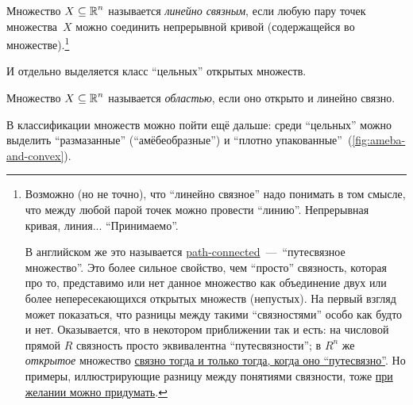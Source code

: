 \documentclass[a4paper,12pt]{article}
\begin{document}
  \begin{definition}
      Множество $X \hm\subseteq \RR^n$ называется \emph{линейно связным}, если любую пару точек множества~$X$ можно соединить непрерывной кривой (содержащейся во множестве).\footnote{
        Возможно (но не точно), что ``линейно связное'' надо понимать в том смысле, что между любой парой точек можно провести ``линию''.
        Непрерывная кривая, линия...
        ``Принимаемо''.
        
        В английском же это называется \href{https://en.wikipedia.org/wiki/Connected_space\#Path_connectedness}{path-connected}~---~``путесвязное множество''.
        Это более сильное свойство, чем ``просто'' связность, которая про то, представимо или нет данное множество как объединение двух или более непересекающихся открытых множеств (непустых).  %
        На первый взгляд может показаться, что разницы между такими ``связностями'' особо как будто и нет.
        Оказывается, что в некотором приближении так и есть: на числовой прямой $R$ связность просто эквивалентна ``путесвязности''; в $R^n$ же \emph{открытое} множество \href{https://en.wikipedia.org/wiki/Connected_space\#Path_connectedness}{связно тогда и только тогда, когда оно ``путесвязно''}.
        Но примеры, иллюстрирующие разницу между понятиями связности, тоже \href{https://w.wiki/DGXV}{при желании можно придумать}.
      }
  \end{definition}

  И отдельно выделяется класс ``цельных'' открытых множеств.

  \begin{definition}
    Множество $X \hm\subseteq \RR^n$ называется \emph{областью}, если оно открыто и линейно связно.
  \end{definition}

  В классификации множеств можно пойти ещё дальше: среди ``цельных'' можно выделить ``размазанные'' (``амёбеобразные'') и ``плотно упакованные''~(\ref{fig:ameba-and-convex}).
\end{document}
